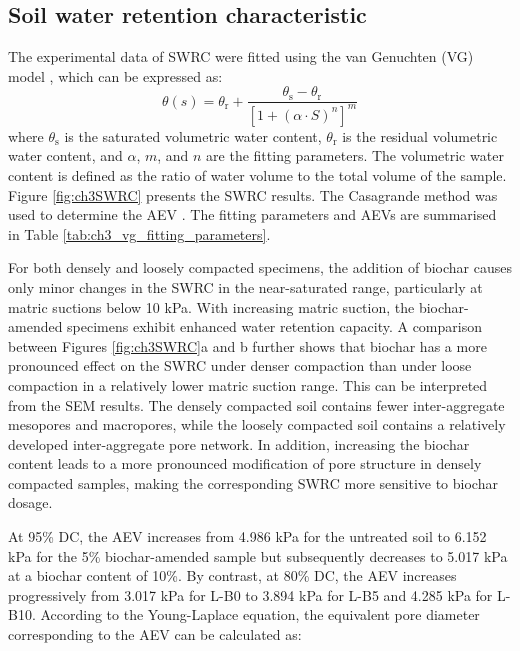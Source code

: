 \subsection{Soil water retention characteristic}
The experimental data of SWRC were fitted using the van Genuchten (VG) model \parencite{vangenuchtenClosedformEquationPredicting1980}, which can be expressed as:
\begin{equation}
    \theta(s) = \theta_{\mathrm{r}} + \frac{\theta_{\mathrm{s}} - \theta_{\mathrm{r}}}{[1 + (\alpha \cdot S)^n]^m}
\end{equation}
where $\theta_{\mathrm{s}}$ is the saturated volumetric water content, $\theta_{\mathrm{r}}$ is the residual volumetric water content, and $\alpha$, $m$, and $n$ are the fitting parameters. The volumetric water content is defined as the ratio of water volume to the total volume of the sample. Figure \ref{fig:ch3SWRC} presents the SWRC results. The Casagrande method was used to determine the \ac{AEV} \parencite{vanapalliInfluenceSoilStructure1999}. The fitting parameters and \acp{AEV} are summarised in Table \ref{tab:ch3_vg_fitting_parameters}.\par
For both densely and loosely compacted specimens, the addition of biochar causes only minor changes in the \ac{SWRC} in the near-saturated range, particularly at matric suctions below 10 kPa. With increasing matric suction, the biochar-amended specimens exhibit enhanced water retention capacity. A comparison between Figures \ref{fig:ch3SWRC}a and b further shows that biochar has a more pronounced effect on the \ac{SWRC} under denser compaction than under loose compaction in a relatively lower matric suction range. This can be interpreted from the \ac{SEM} results. The densely compacted soil contains fewer inter-aggregate mesopores and macropores, while the loosely compacted soil contains a relatively developed inter-aggregate pore network. In addition, increasing the biochar content leads to a more pronounced modification of pore structure in densely compacted samples, making the corresponding \ac{SWRC} more sensitive to biochar dosage.\par
At 95\% \ac{DC}, the \ac{AEV} increases from 4.986 kPa for the untreated soil to 6.152 kPa for the 5\% biochar-amended sample but subsequently decreases to 5.017 kPa at a biochar content of 10\%. By contrast, at 80\% \ac{DC}, the \ac{AEV} increases progressively from 3.017 kPa for L-B0 to 3.894 kPa for L-B5 and 4.285 kPa for L-B10. According to the Young-Laplace equation, the equivalent pore diameter corresponding to the \ac{AEV} can be calculated as:
